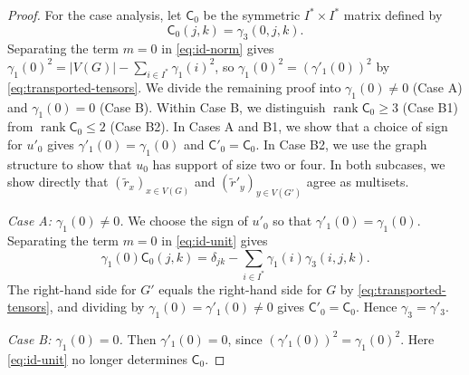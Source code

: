 \documentclass[10pt,a4paper]{article}
\theoremstyle{plain}
\theoremstyle{definition}
\DeclareMathOperator{\rank}{rank}
\begin{document}
\begin{proof}
  For the case analysis, let $\mathsf C_0$ be the symmetric
  $I^*\times I^*$ matrix defined by
  \begin{equation}\label{eq:unknowns}
    \mathsf C_0(j,k) = \gamma_3(0,j,k).
  \end{equation}
  Separating the term $m=0$ in \cref{eq:id-norm} gives
  $\gamma_1(0)^2=|V(G)|-\sum_{i\in I^*}\gamma_1(i)^2$, so
  $\gamma_1(0)^2=(\gamma'_1(0))^2$ by \cref{eq:transported-tensors}.
  We divide the remaining proof into $\gamma_1(0)\ne0$ (Case A)
  and $\gamma_1(0)=0$ (Case B).
  Within Case B, we distinguish $\rank\mathsf C_0\geq3$ (Case B1)
  from $\rank\mathsf C_0\leq2$ (Case B2).
  In Cases A and B1, we show that a choice of sign for $u'_0$ gives
  $\gamma'_1(0)=\gamma_1(0)$ and $\mathsf C'_0=\mathsf C_0$.
  In Case B2, we use the graph structure to show that $u_0$ has
  support of size two or four. In both subcases, we show directly
  that $(\tilde{r}_x)_{x\in V(G)}$ and $(\tilde{r}'_y)_{y\in V(G')}$ agree as multisets.

  \emph{Case A: $\gamma_1(0) \neq 0$.} We choose the sign of $u'_0$ so
  that $\gamma'_1(0)=\gamma_1(0)$. Separating the term $m=0$ in
  \cref{eq:id-unit} gives
  \begin{equation}
    \label{eq:caseA}
    \gamma_1(0) \mathsf{C}_0(j,k) = \delta_{jk} - \sum_{i \in I^{*}} \gamma_1(i) \gamma_3(i,j,k).
  \end{equation}
  The right-hand side for $G'$ equals the right-hand side for $G$ by
  \cref{eq:transported-tensors}, and dividing by
  $\gamma_1(0)=\gamma'_1(0)\neq0$ gives $\mathsf C'_0=\mathsf C_0$.
  Hence $\gamma_3=\gamma'_3$.

  \emph{Case B: $\gamma_1(0) = 0$.} Then $\gamma'_1(0)=0$, since
  $(\gamma'_1(0))^2=\gamma_1(0)^2$. Here \cref{eq:id-unit} no longer
  determines $\mathsf C_0$.


\end{proof}
\end{document}
